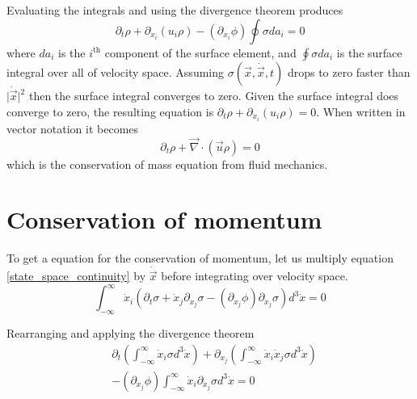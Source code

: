 \documentclass[%
 reprint,
 amsmath,amssymb,
 aps,
]{revtex4-1}
\newcommand{\dvec}[1]{\dot{\vec{#1}}}
\newcommand{\grad}{\vec{\nabla}}
\newcommand{\intVdot}[1]{\int_{-\infty}^{\infty} #1 d^3\dot{x}}
\begin{document}
Evaluating the integrals and using the divergence theorem produces
\[
\partial_t\rho + \partial_{x_i}\left(u_i\rho\right)-\left(\partial_{x_i}\phi\right)\oint{\sigma da_i}=0
\]
where $da_i$ is the $i^{\text{th}}$ component of the surface element, and $\oint{\sigma da_i}$ is the surface integral over all of velocity space. Assuming $\sigma(\vec{x}, \dvec{x}, t)$ drops to zero faster than $\lvert\dvec{x}\rvert^2$ then the surface integral converges to zero. Given the surface integral does converge to zero, the resulting equation is $\partial_t\rho + \partial_{x_i}\left(u_i\rho\right)=0$. When written in vector notation it becomes
\begin{equation}
\partial_t\rho + \grad\cdot\left(\vec{u}\rho\right)=0
\label{conservation_of_mass}
\end{equation}
which is the conservation of mass equation from fluid mechanics.

\section{Conservation of momentum}
To get a equation for the conservation of momentum, let us multiply equation \eqref{state_space_continuity} by $\dvec{x}$ before integrating over velocity space.
\[
\intVdot{\dot{x}_i\left(\partial_t \sigma + \dot{x}_j\partial_{x_j}\sigma-\left(\partial_{x_j}\phi\right)\partial_{\dot{x}_j}\sigma\right)}=0
\]

Rearranging and applying the divergence theorem
\[
\begin{split}
&\partial_t\left(\intVdot{\dot{x}_i\sigma}\right) + \partial_{x_j}\left(\intVdot{\dot{x}_i\dot{x}_j\sigma}\right) \\ & - \left(\partial_{x_j}\phi\right)\intVdot{\dot{x}_i\partial_{\dot{x}_j}\sigma}=0
\end{split}
\]
\end{document}
